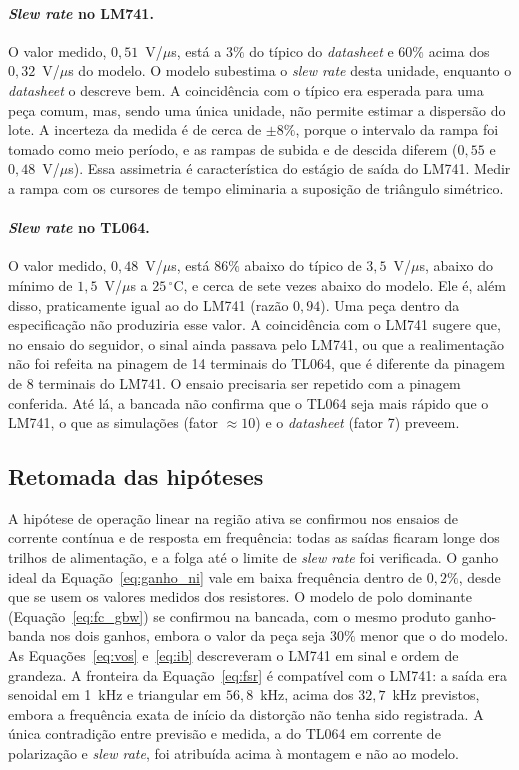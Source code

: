 \documentclass[11pt,a4paper]{article}
\begin{document}
\paragraph{\textit{Slew rate} no LM741.} O valor medido, $0{,}51$~V/$\mu$s, está a $3\%$ do típico
do \textit{datasheet} e $60\%$ acima dos $0{,}32$~V/$\mu$s do modelo. O modelo subestima o
\textit{slew rate} desta unidade, enquanto o \textit{datasheet} o descreve bem. A coincidência com o
típico era esperada para uma peça comum, mas, sendo uma única unidade, não permite estimar a
dispersão do lote. A incerteza da medida é de cerca de $\pm8\%$, porque o intervalo da rampa foi
tomado como meio período, e as rampas de subida e de descida diferem ($0{,}55$ e $0{,}48$~V/$\mu$s).
Essa assimetria é característica do estágio de saída do LM741. Medir a rampa com os cursores de
tempo eliminaria a suposição de triângulo simétrico.

\paragraph{\textit{Slew rate} no TL064.} O valor medido, $0{,}48$~V/$\mu$s, está $86\%$ abaixo do
típico de $3{,}5$~V/$\mu$s, abaixo do mínimo de $1{,}5$~V/$\mu$s a $25\,^\circ$C, e cerca de sete
vezes abaixo do modelo. Ele é, além disso, praticamente igual ao do LM741 (razão $0{,}94$). Uma
peça dentro da especificação não produziria esse valor. A coincidência com o LM741 sugere que, no
ensaio do seguidor, o sinal ainda passava pelo LM741, ou que a realimentação não foi refeita na
pinagem de 14 terminais do TL064, que é diferente da pinagem de 8 terminais do LM741. O ensaio
precisaria ser repetido com a pinagem conferida. Até lá, a bancada não confirma que o TL064 seja
mais rápido que o LM741, o que as simulações (fator $\approx10$) e o \textit{datasheet} (fator 7)
preveem.

\subsection{Retomada das hipóteses}

A hipótese de operação linear na região ativa se confirmou nos ensaios de corrente contínua e de
resposta em frequência: todas as saídas ficaram longe dos trilhos de alimentação, e a folga até o
limite de \textit{slew rate} foi verificada. O ganho ideal da Equação~\eqref{eq:ganho_ni} vale em
baixa frequência dentro de $0{,}2\%$, desde que se usem os valores medidos dos resistores. O modelo
de polo dominante (Equação~\eqref{eq:fc_gbw}) se confirmou na bancada, com o mesmo produto
ganho-banda nos dois ganhos, embora o valor da peça seja $30\%$ menor que o do modelo. As
Equações~\eqref{eq:vos} e~\eqref{eq:ib} descreveram o LM741 em sinal e ordem de grandeza. A
fronteira da Equação~\eqref{eq:fsr} é compatível com o LM741: a saída era senoidal em 1~kHz e
triangular em $56{,}8$~kHz, acima dos $32{,}7$~kHz previstos, embora a frequência exata de início da
distorção não tenha sido registrada. A única contradição entre previsão e medida, a do TL064 em
corrente de polarização e \textit{slew rate}, foi atribuída acima à montagem e não ao modelo.
\end{document}
